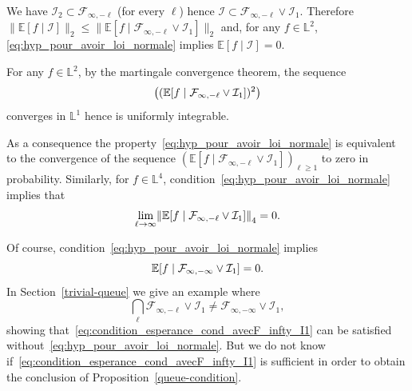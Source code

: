 \documentclass[AHL,Unicode,longabstracts,published]{cedram}
\newcommand*\bbL{\mathbb{L}}
\newcommand{\bbE}{\mathbb{E}}
\newcommand{\E}[1]{\bbE\left[#1\right]}
\newcommand*\I{\mathcal{I}}
\newcommand*\F{\mathcal{F}}
\newcommand{\Fca}{\mathcal{F}}
\newcommand{\norm}[1]{\left\lVert #1\right\rVert}
\renewcommand*{\to}{\mathchoice{\longrightarrow}{\rightarrow}{\rightarrow}{\rightarrow}}
\let\originalleft\left
\let\originalright\right
\renewcommand{\left}{\mathopen{}\mathclose\bgroup\originalleft}
\renewcommand{\right}{\aftergroup\egroup\originalright}
\begin{document}
\begin{rema}
We have $\I_2\subset \F_{\infty, -\ell}$ (for every $\ell$) hence $\I \subset
\F_{\infty, -\ell}\vee \I_1$. Therefore $\|\bbE[f\mid\I]\|_2 \leq \|\bbE[f\mid
\F_{\infty, -\ell}\vee \I_1]\|_2$ and, for any $f\in \bbL^2$, \eqref{eq:hyp_pour_avoir_loi_normale} implies $\bbE[f\mid\I] =0$.
\end{rema}
\begin{rema}
For any $f\in\bbL^2$, by the martingale convergence theorem, the sequence
\[
\left((\bbE[f\mid \Fca_{\infty,-\ell}\vee
\I_1])^2\right)
\]
converges in $\bbL^1$ hence is uniformly
integrable.
\end{rema}

As a consequence the property~\eqref{eq:hyp_pour_avoir_loi_normale} is equivalent to the convergence of the sequence $(\bbE[f\mid\F_{\infty, -\ell}\vee \I_1])_{\ell\geq 1}$ to zero in probability. Similarly, for $f\in \bbL^4$, condition~\eqref{eq:hyp_pour_avoir_loi_normale} implies that
\begin{equation}\label{eq:hyp_pour_avoir_loi_normale_4}
\lim_{\ell\to\infty}
\norm{
\E{f\mid\F_{\infty, -\ell}\vee \I_1 }}_4=0.
\end{equation}
\begin{rema}
Of course, condition~\eqref{eq:hyp_pour_avoir_loi_normale} implies
\begin{equation}\label{eq:condition_esperance_cond_avecF_infty_I1}
\E{f\mid \F_{\infty, -\infty}\vee \I_1}=0.
\end{equation}
In Section~\ref{trivial-queue} we give an example where
\[
\bigcap_\ell \F_{\infty, -\ell}\vee \I_1\neq\F_{\infty, -\infty}\vee \I_1,
\]
showing that~\eqref{eq:condition_esperance_cond_avecF_infty_I1} can be satisfied without~\eqref{eq:hyp_pour_avoir_loi_normale}. But we do not know if~\eqref{eq:condition_esperance_cond_avecF_infty_I1} is sufficient in order to obtain the conclusion of Proposition~\ref{queue-condition}.
\end{rema}
\end{document}
